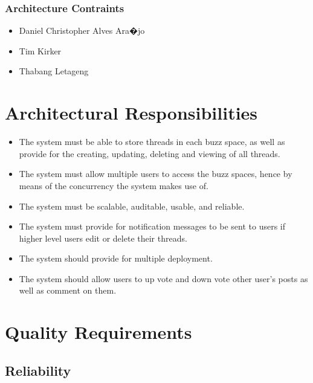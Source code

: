 \documentclass[a4paper,12pt]{report}
\begin{document}
			\subsubsection{Architecture Contraints}
				\begin{itemize}
					\item Daniel Christopher Alves Ara�jo
					\item Tim Kirker
					\item Thabang Letageng
				\end{itemize}
\newpage
	\section{Architectural Responsibilities}
	\begin{itemize}
	\item The system must be able to store threads in each buzz space, as well as provide for the creating, updating, deleting and viewing of all threads.
	\item The system must allow multiple users to access the buzz spaces, hence by means of the concurrency the system makes use of.
	\item The system must be scalable, auditable, usable, and reliable.
	\item The system must provide for notification messages to be sent to users if higher level users edit or delete their threads.
	\item The system should provide for multiple deployment.
	\item The system should allow users to up vote and down vote other user's posts as well as comment on them.
	\end{itemize}
\newpage
	\section{Quality Requirements}
	\subsection{Reliability}
\end{document}
